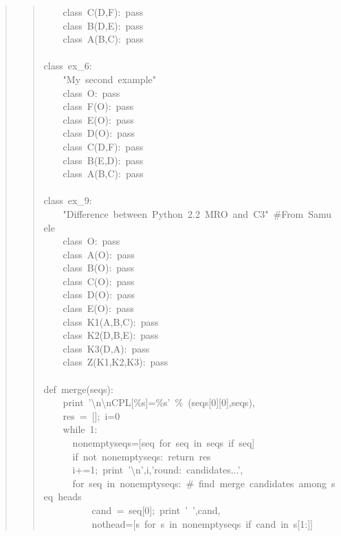 \documentclass[10pt,a4paper,english]{article}
\begin{document}
\begin{quote}
\begin{quote}
{~~~~class~C(D,F):~pass~\\
~~~~class~B(D,E):~pass~\\
~~~~class~A(B,C):~pass~\\
~\\
class~ex{\_}6:~\\
~~~~"My~second~example"~\\
~~~~class~O:~pass~\\
~~~~class~F(O):~pass~\\
~~~~class~E(O):~pass~\\
~~~~class~D(O):~pass~\\
~~~~class~C(D,F):~pass~\\
~~~~class~B(E,D):~pass~\\
~~~~class~A(B,C):~pass~\\
~\\
class~ex{\_}9:~\\
~~~~"Difference~between~Python~2.2~MRO~and~C3"~{\#}From~Samuele~\\
~~~~class~O:~pass~\\
~~~~class~A(O):~pass~\\
~~~~class~B(O):~pass~\\
~~~~class~C(O):~pass~\\
~~~~class~D(O):~pass~\\
~~~~class~E(O):~pass~\\
~~~~class~K1(A,B,C):~pass~\\
~~~~class~K2(D,B,E):~pass~\\
~~~~class~K3(D,A):~pass~\\
~~~~class~Z(K1,K2,K3):~pass~\\
~\\
def~merge(seqs):~\\
~~~~print~'{\textbackslash}n{\textbackslash}nCPL{[}{\%}s]={\%}s'~{\%}~(seqs{[}0]{[}0],seqs),~\\
~~~~res~=~{[}];~i=0~\\
~~~~while~1:~\\
~~~~~~nonemptyseqs={[}seq~for~seq~in~seqs~if~seq]~\\
~~~~~~if~not~nonemptyseqs:~return~res~\\
~~~~~~i+=1;~print~'{\textbackslash}n',i,'round:~candidates...',~\\
~~~~~~for~seq~in~nonemptyseqs:~{\#}~find~merge~candidates~among~seq~heads~\\
~~~~~~~~~~cand~=~seq{[}0];~print~'~',cand,~\\
~~~~~~~~~~nothead={[}s~for~s~in~nonemptyseqs~if~cand~in~s{[}1:]]~\\
}
\end{quote}
\end{quote}
\end{document}
